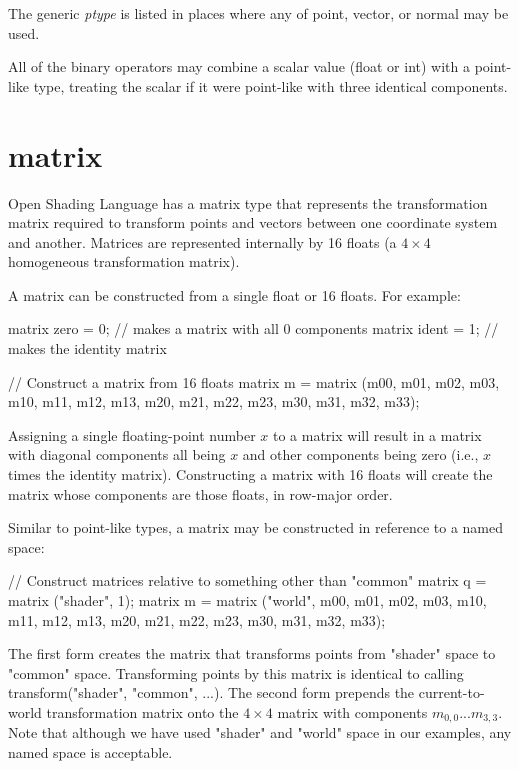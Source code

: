 \documentclass[11pt,letterpaper]{book}
\def\langname{Open Shading Language\xspace}
\def\float{{\cf float}\xspace}
\def\inttype{{\cf int}\xspace}
\def\matrix{{\cf matrix}\xspace}
\def\normal{{\cf normal}\xspace}
\def\point{{\cf point}\xspace}
\def\vector{{\cf vector}\xspace}
\def\commonspace{{\cf "common"} space\xspace}
\def\shaderspace{{\cf "shader"} space\xspace}
\begin{document}
\smallskip

\noindent The generic \emph{ptype} is listed in places where any
of \point, \vector, or \normal may be used.

All of the binary operators may combine a scalar value (\float or
\inttype) with a point-like type, treating the scalar if it were
point-like with three identical components.


\section{{\cf matrix}}
\label{sec:types:matrix}
 

\langname has a \matrix type that represents the transformation matrix
required to transform points and vectors between one coordinate system
and another.  Matrices are represented internally by 16 floats (a $4
\times 4$ homogeneous transformation matrix).

A \matrix can be constructed from a single float or 16 floats.  For
example:

\begin{code}
    matrix zero = 0;   // makes a matrix with all 0 components
    matrix ident = 1;  // makes the identity matrix

    // Construct a matrix from 16 floats
    matrix m = matrix (m00, m01, m02, m03, m10, m11, m12, m13, 
                       m20, m21, m22, m23, m30, m31, m32, m33);
\end{code}

\noindent Assigning a single floating-point number $x$ to a matrix will result
in a matrix with diagonal components all being $x$ and other
components being zero (i.e., $x$ times the identity matrix).
Constructing a matrix with 16 floats will create the matrix whose
components are those floats, in row-major order.  

Similar to point-like types, a {\cf matrix} may be constructed in
reference to a named space:

\begin{code}
    // Construct matrices relative to something other than "common"
    matrix q = matrix ("shader", 1);
    matrix m = matrix ("world", m00, m01, m02, m03, m10, m11, m12, m13, 
                               m20, m21, m22, m23, m30, m31, m32, m33);
\end{code}

\noindent The first form creates the matrix that transforms points from
\shaderspace to \commonspace.  Transforming points by this matrix
is identical to calling {\cf transform("shader", "common", ...)}.
The second form prepends the current-to-world transformation matrix
onto the $4 \times 4$ matrix with components $m_{0,0} ... m_{3,3}$.
Note that although we have used {\cf "shader"} and {\cf "world"}
space in our examples, any named space is acceptable.
\end{document}
